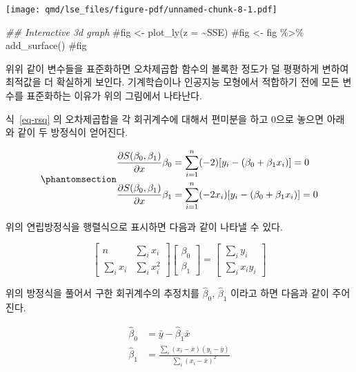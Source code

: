 \documentclass[
  11pt,
  a4paper,
  oneside]{scrbook}
\newenvironment{Shaded}{\begin{snugshade}}{\end{snugshade}}
\newcommand{\CommentTok}[1]{\textcolor[rgb]{0.37,0.37,0.37}{#1}}
\newcommand{\DocumentationTok}[1]{\textcolor[rgb]{0.37,0.37,0.37}{\textit{#1}}}
\newcommand{\pardiff}[1]{\frac{\partial #1}{\partial x }}
\theoremstyle{definition}
\theoremstyle{plain}
\theoremstyle{definition}
\theoremstyle{definition}
\theoremstyle{remark}
\begin{document}
\texttt{[image: qmd/lse\_files/figure-pdf/unnamed-chunk-8-1.pdf]}

\begin{Shaded}
\begin{Highlighting}[]
\DocumentationTok{\#\# Interactive 3d graph}
\CommentTok{\#fig \textless{}{-} plot\_ly(z = \textasciitilde{}SSE)}
\CommentTok{\#fig \textless{}{-} fig \%\textgreater{}\% add\_surface()}
\CommentTok{\#fig}
\end{Highlighting}
\end{Shaded}

위위 같이 변수들을 표준화하면 오차제곱합 함수의 볼록한 정도가 덜
평평하게 변하여 최적값을 더 확실하게 보인다. 기계학습이나 인공지능
모형에서 적합하기 전에 모든 변수를 표준화하는 이유가 위의 그림에서
나타난다.

식~\ref{eq-rsq} 의 오차제곱합을 각 회귀계수에 대해서 편미분을 하고 0으로
놓으면 아래와 같이 두 방정식이 얻어진다.

\begin{equation}\phantomsection\label{eq-normaleq02}{
\begin{aligned}
 \pardiff{ S(\beta_0 , \beta_1)}{\beta_0} & = \sum^n_{i=1}(-2)[y_i-(\beta_0+\beta_1 x_i)]=0    \\ \notag 
\pardiff{ S(\beta_0 , \beta_1)}{\beta_1}  & = \sum^n_{i=1}(-2 x_i)[y_i-(\beta_0+\beta_1 x_i)]=0 
\end{aligned}
}\end{equation}

위의 연립방정식을 행렬식으로 표시하면 다음과 같이 나타낼 수 있다.

\[ 
\begin{bmatrix}
n & \sum_i x_i \\
\sum_i x_i & \sum_i x^2_i
\end{bmatrix}
\begin{bmatrix}
\beta_0 \\
\beta_1
\end{bmatrix}
=
\begin{bmatrix}
\sum_i y_i \\
\sum_i x_i y_i
\end{bmatrix}
\]

위의 방정식을 풀어서 구한 회귀계수의 추정치를 \(\hat \beta_0\),
\(\hat \beta_1\) 이라고 하면 다음과 같이 주어진다.

\begin{align*}
 \hat \beta_0 &= \bar y - \hat \beta_1 \bar x  \\ 
  \hat \beta_1 &=  \frac{ \sum_i (x_i - \bar x)(y_i - \bar y)}{\sum_i (x_i - \bar x)^2} 
\end{align*}
\end{document}
